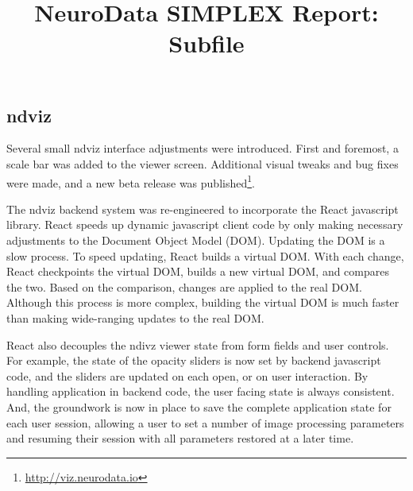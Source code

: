 \documentclass[simplex.tex]{subfiles}
\title{NeuroData SIMPLEX Report: Subfile}
\begin{document}


\subsection{ndviz}

Several small ndviz interface adjustments were introduced. First and foremost, a scale bar was added to the viewer screen. Additional visual tweaks and bug fixes were made, and a new beta release was published\footnote{\href{http://viz.neurodata.io}{http://viz.neurodata.io}}.

The ndviz backend system was re-engineered to incorporate the React javascript library. React speeds up dynamic javascript client code by only making necessary adjustments to the Document Object Model (DOM). Updating the DOM is a slow process. To speed updating, React builds a virtual DOM. With each change, React checkpoints the virtual DOM, builds a new virtual DOM, and compares the two. Based on the comparison, changes are applied to the real DOM. Although this process is more complex, building the virtual DOM is much faster than making wide-ranging updates to the real DOM. 


React also decouples the ndivz viewer state from form fields and user controls. For example, the state of the opacity sliders is now set by backend javascript code, and the sliders are updated on each open, or on user interaction. By handling application in backend code, the user facing state is always consistent. And, the groundwork is now in place to save the complete application state for each user session, allowing a user to set a number of image processing parameters and resuming their session with all parameters restored at a later time. 
\end{document}
